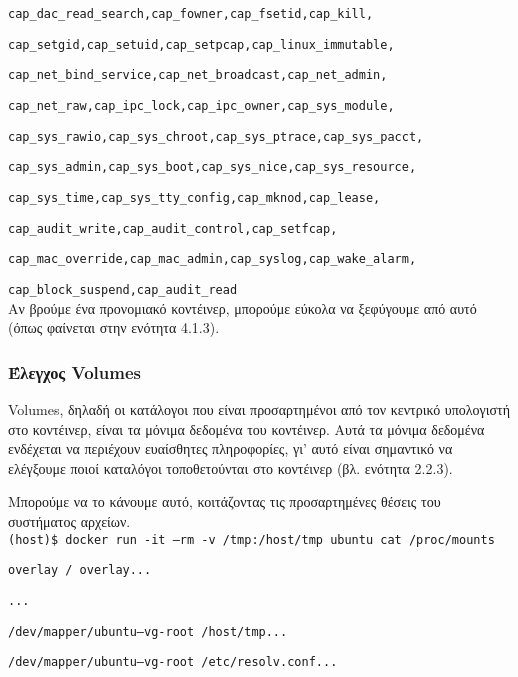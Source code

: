 \texttt{\textlatin{cap\_dac\_read\_search,cap\_fowner,cap\_fsetid,cap\_kill,}}

\texttt{\textlatin{cap\_setgid,cap\_setuid,cap\_setpcap,cap\_linux\_immutable,}}

\texttt{\textlatin{cap\_net\_bind\_service,cap\_net\_broadcast,cap\_net\_admin,}}

\texttt{\textlatin{cap\_net\_raw,cap\_ipc\_lock,cap\_ipc\_owner,cap\_sys\_module,}}

\texttt{\textlatin{cap\_sys\_rawio,cap\_sys\_chroot,cap\_sys\_ptrace,cap\_sys\_pacct,}}

\texttt{\textlatin{cap\_sys\_admin,cap\_sys\_boot,cap\_sys\_nice,cap\_sys\_resource,}}

\texttt{\textlatin{cap\_sys\_time,cap\_sys\_tty\_config,cap\_mknod,cap\_lease,}}

\texttt{\textlatin{cap\_audit\_write,cap\_audit\_control,cap\_setfcap,}}

\texttt{\textlatin{cap\_mac\_override,cap\_mac\_admin,cap\_syslog,cap\_wake\_alarm,}}

\texttt{\textlatin{cap\_block\_suspend,cap\_audit\_read}} \\

Αν βρούμε ένα προνομιακό κοντέινερ, μπορούμε εύκολα να ξεφύγουμε από αυτό (όπως
φαίνεται στην ενότητα 4.1.3).

\subsubsection{Έλεγχος \textlatin{Volumes}}

\textlatin{Volumes}, δηλαδή οι κατάλογοι που είναι προσαρτημένοι από τον
κεντρικό υπολογιστή στο κοντέινερ, είναι τα μόνιμα δεδομένα του κοντέινερ. Αυτά
τα μόνιμα δεδομένα ενδέχεται να περιέχουν ευαίσθητες πληροφορίες, γι' αυτό είναι
σημαντικό να ελέγξουμε ποιοί καταλόγοι τοποθετούνται στο κοντέινερ (βλ.
ενότητα 2.2.3).

Μπορούμε να το κάνουμε αυτό, κοιτάζοντας τις προσαρτημένες θέσεις του συστήματος
αρχείων. \\

\texttt{\textlatin{(host)\$ docker run -it --rm -v /tmp:/host/tmp ubuntu cat /proc/mounts}}

\texttt{\textlatin{overlay / overlay...}}

\texttt{\textlatin{...}}

\texttt{\textlatin{/dev/mapper/ubuntu--vg-root /host/tmp...}}

\texttt{\textlatin{/dev/mapper/ubuntu--vg-root /etc/resolv.conf...}}

